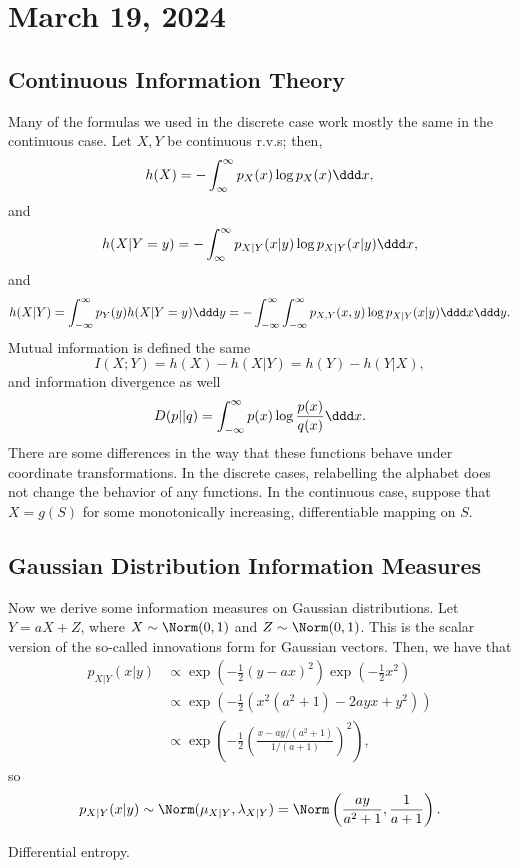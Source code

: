 \section{March 19, 2024}

\subsection{Continuous Information Theory}

Many of the formulas we used in the discrete case work mostly the same in the continuous case. Let $X,Y$ be continuous r.v.s; then, 
\[h(X) = -\int_{\infty}^{\infty} p_X(x) \log p_X(x)\ddd x,\] 
and 
\[h(X|Y=y) = -\int_{\infty}^{\infty}p_{X|Y}(x|y)\log p_{X|Y}(x|y)\ddd x,\]
and 
\[h(X|Y) = \int_{-\infty}^{\infty}p_Y(y)h(X|Y=y)\ddd y = -\int_{-\infty}^{\infty}\int_{-\infty}^{\infty} p_{X,Y}(x,y)\log p_{X|Y}(x|y)\ddd x \ddd y.\] 
Mutual information is defined the same
\[I(X;Y) = h(X) - h(X|Y) = h(Y) - h(Y|X),\]
and information divergence as well
\[D(p||q) = \int_{-\infty}^{\infty}p(x) \log \frac{p(x)}{q(x)}\ddd x.\] 
There are some differences in the way that these functions behave under coordinate transformations. In the discrete cases, relabelling the alphabet does not change the behavior of any functions. In the continuous case, suppose that $X = g(S)$ for some monotonically increasing, differentiable mapping on $S$. 

\subsection{Gaussian Distribution Information Measures}

Now we derive some information measures on Gaussian distributions. Let $Y = aX + Z$, where $X\sim \Norm(0,1)$ and $Z\sim \Norm(0,1)$. This is the scalar version of the so-called \ac{innovations form} for Gaussian vectors. Then, we have that 
\begin{align*}
	p_{X|Y}(x|y) &\propto \exp \left(-\frac{1}{2}(y-ax)^2\right)\exp \left(-\frac{1}{2}x^2\right) \\
							 &\propto \exp \left(-\frac{1}{2} \left(x^2(a^2+1) - 2ayx + y^2\right)\right) \\
							 &\propto \exp \left(-\frac{1}{2} \left(\frac{x - ay/(a^2+1)}{1/(a+1)}\right)^2\right),
\end{align*}
so 
\[p_{X|Y}(x|y) \sim \Norm(\mu_{X|Y}, \lambda_{X|Y}) = \Norm\left(\frac{ay}{a^2+1}, \frac{1}{a+1}\right).\] 

\begin{example}
\exlabel

Differential entropy.
\end{example}

